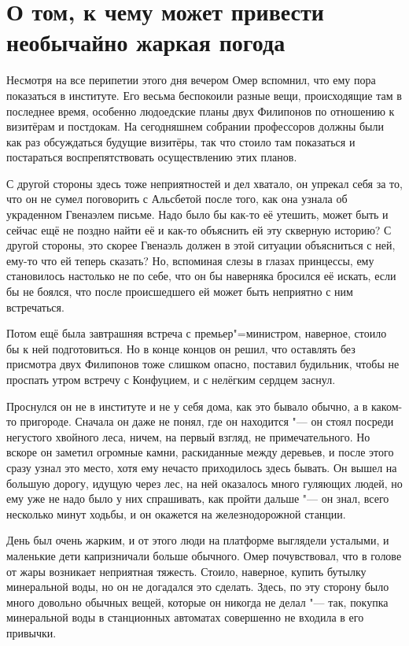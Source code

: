 \section{О том, к чему может привести необычайно жаркая погода}

Несмотря на все перипетии этого дня вечером Омер вспомнил, что ему пора
показаться в институте.
Его весьма беспокоили разные вещи, происходящие там в последнее время, особенно
людоедские планы двух Филипонов по отношению к визитёрам и постдокам.
На сегодняшнем собрании профессоров должны были как раз обсуждаться будущие
визитёры, так что стоило там показаться и постараться воспрепятствовать
осуществлению этих планов.

С другой стороны здесь тоже неприятностей и дел хватало, он упрекал себя за то,
что он не сумел поговорить с Альсбетой после того, как она узнала об украденном
Гвенаэлем письме.
Надо было бы как-то её утешить, может быть и сейчас ещё не поздно найти её и
как-то объяснить ей эту скверную историю?
С другой стороны, это скорее Гвенаэль должен в этой ситуации объясниться с ней,
ему-то что ей теперь сказать?
Но, вспоминая слезы в глазах принцессы, ему становилось настолько не по себе,
что он бы наверняка бросился её искать, если бы не боялся, что после
происшедшего ей может быть неприятно с ним встречаться.

Потом ещё была завтрашняя встреча с премьер"=министром, наверное, стоило бы к
ней подготовиться.
Но в конце концов он решил, что оставлять без присмотра двух Филипонов тоже
слишком опасно, поставил будильник, чтобы не проспать утром встречу с Конфуцием,
и с нелёгким сердцем заснул.

Проснулся он не в институте и не у себя дома, как это бывало обычно, а в
каком-то пригороде.
Сначала он даже не понял, где он находится "--- он стоял посреди негустого
хвойного леса, ничем, на первый взгляд, не примечательного.
Но вскоре он заметил огромные камни, раскиданные между деревьев, и после этого
сразу узнал это место, хотя ему нечасто приходилось здесь бывать.
Он вышел на большую дорогу, идущую через лес, на ней оказалось много гуляющих
людей, но ему уже не надо было у них спрашивать, как пройти дальше "--- он знал,
всего несколько минут ходьбы, и он окажется на железнодорожной станции.

День был очень жарким, и от этого люди на платформе выглядели усталыми, и
маленькие дети капризничали больше обычного.
Омер почувствовал, что в голове от жары возникает неприятная тяжесть.
Стоило, наверное, купить бутылку минеральной воды, но он не догадался это
сделать.
Здесь, по эту сторону было много довольно обычных вещей, которые он никогда не
делал "--- так, покупка минеральной воды в станционных автоматах совершенно не
входила в его привычки.


